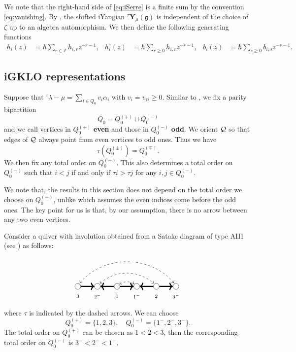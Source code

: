 We note that the right-hand side of \cref{eq:iSerre} is a finite sum by the convention \cref{eq:vanishing}. By \cite[Rem 3.3]{SSX25}, the shifted iYangian ${}^{\tau}\mathbf{Y}_{\mu}(\mathfrak{g})$ is independent of the choice of $\zeta$ up to an algebra automorphism. We then define the following generating functions
\begin{align}
\label{generatingfunction}
h_i(z) & = \hbar\sum_{r\in \mathbb{Z}}h_{i,r}z^{-r-1},&
h_i^\circ(z) & = \hbar\sum_{r\geq 0}h_{i,r}z^{-r-1},&
b_i(z) & = \hbar\sum_{s\geq 0}b_{i,s}z^{-s-1}.
\end{align}


\subsection{iGKLO representations}
\label{sec:iGKLO}
Suppose that ${}^\tau\lambda-\mu=\sum_{i\in Q_0} v_i \alpha_i$ with $v_i=v_{\tau i}\geq 0$. 
Similar to \cite[Sect. 2.1]{KTWWY19}, we fix a parity bipartition $$Q_0=Q_0^{(+)}\sqcup Q_0^{(-)}$$ and  we
call vertices in $Q_0^{(+)}$ {\bf even} and those in $ Q_0^{(-)}$
{\bf odd}. We orient $\mathcal{Q}$ so that edges of $\mathcal{Q}$ always point from even vertices to odd ones. Thus we have 
\[
\tau (Q_0^{(\pm)})=Q_0^{(\mp)}.
\]
We then fix any total order on $Q_0^{(+)}$. This also determines a total order on $Q_0^{(-)}$ such that $i<j$ if and only if $\tau i > \tau j$ for any $i,j\in Q_0^{(-)}$.

\begin{remark}
    We note that, the results in this section does not depend on the total order we choose on $Q_0^{(+)}$, unlike \cite[Sect. 2.1]{KTWWY19} which assumes the even indices come before the odd ones. The key point for us is that, by our assumption, there is no arrow between any two even vertices.
\end{remark}

\begin{example}
    Consider a quiver with involution obtained from a Satake diagram of type AIII (see \cite{Ara62}) as follows:
    \[\begin{tikzpicture}[scale=1, 
                    arrow/.style={<->,dashed}]
\foreach \i in {0,...,5}
    \node[circle, draw, inner sep=3pt] (a\i) at (\i,0) {};
    \foreach \i in {0,...,5}
    \node (b\i) at (\i,.05) {};
    \node  at (0,-.5) {$\scriptstyle 3$};
    \node  at (1,-.5) {$\scriptstyle 2^-$};
    \node  at (2,-.5) {$\scriptstyle 1$};
    \node  at (3,-.5) {$\scriptstyle 1^-$};
    \node  at (4,-.5) {$\scriptstyle 2$};
    \node  at (5,-.5) {$\scriptstyle 3^-$};
\draw[arrow] (b0) to[bend left=50] (b5);
\draw[arrow] (b1) to[bend left=40] (b4);
\draw[arrow] (b2) to[bend left=30] (b3);
\draw[->,ultra thick] (a0) -- (a1); 
\draw[->,ultra thick] (a2) -- (a1); 
\draw[->,ultra thick] (a2) -- (a3); 
\draw[->,ultra thick] (a4) -- (a3); 
\draw[->,ultra thick] (a4) -- (a5); 
\end{tikzpicture}
\]
where $\tau$ is indicated by the dashed arrows. We can choose \[
Q_0^{(+)}=\{1,2,3\},\quad Q_0^{(-)}=\{1^-,2^-,3^-\}.
\]
The total order on $Q_0^{(+)}$ can be chosen as $1<2<3$, then the corresponding total order on $Q_0^{(-)}$ is $3^-<2^-<1^-$.
\end{example}

